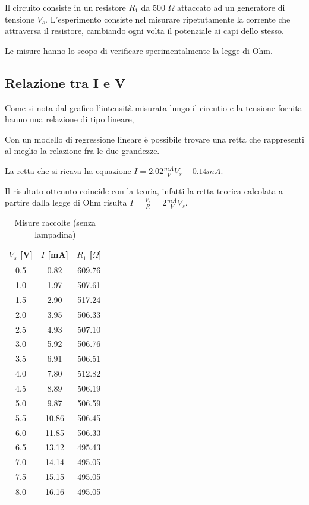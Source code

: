 \documentclass[a4paper,6pt]{article}
\begin{document}
Il circuito consiste in un resistore \(R_1\) da 500 \(\Omega\) attaccato ad un generatore di tensione \(V_s\).
L'esperimento consiste nel misurare ripetutamente la corrente che attraversa il resistore, cambiando ogni volta il potenziale ai capi dello stesso.

Le misure hanno lo scopo di verificare sperimentalmente la legge di Ohm.

\subsection{Relazione tra I e V}
 Come si nota dal grafico l'intensità misurata lungo il circutio e la tensione fornita hanno una relazione di tipo lineare,

 Con un modello di regressione lineare è possibile trovare una retta che rappresenti al meglio la relazione fra le due grandezze.

 La retta che si ricava ha equazione \(I=2.02 \frac{mA}{V} V_s -0.14 mA\).

 Il risultato ottenuto coincide con la teoria, infatti la retta teorica calcolata a partire dalla legge di Ohm risulta \(I = \frac{V_s}{R} = 2 \frac{mA}{V} V_s\).

 \begin{table}[!ht]
    \centering
    \begin{tabular}{|c|c|c|}
        \hline
        \(V_s\) [V] & \(I\) [mA] & \(R_1\) [\(\Omega\)] \\ \hline
        0.5 & 0.82 & 609.76 \\ \hline
        1.0 & 1.97 & 507.61 \\ \hline
        1.5 & 2.90 & 517.24 \\ \hline
        2.0 & 3.95 & 506.33 \\ \hline
        2.5 & 4.93 & 507.10 \\ \hline
        3.0 & 5.92 & 506.76 \\ \hline
        3.5 & 6.91 & 506.51 \\ \hline
        4.0 & 7.80 & 512.82 \\ \hline
        4.5 & 8.89 & 506.19 \\ \hline
        5.0 & 9.87 & 506.59 \\ \hline
        5.5 & 10.86 & 506.45 \\ \hline
        6.0 & 11.85 & 506.33 \\ \hline
        6.5 & 13.12 & 495.43 \\ \hline
        7.0 & 14.14 & 495.05 \\ \hline
        7.5 & 15.15 & 495.05 \\ \hline
        8.0 & 16.16 & 495.05 \\ \hline
    \end{tabular}
    \caption{Misure raccolte (senza lampadina)}
    \label{tab:misure_senza_lampadina}
\end{table}
\end{document}
